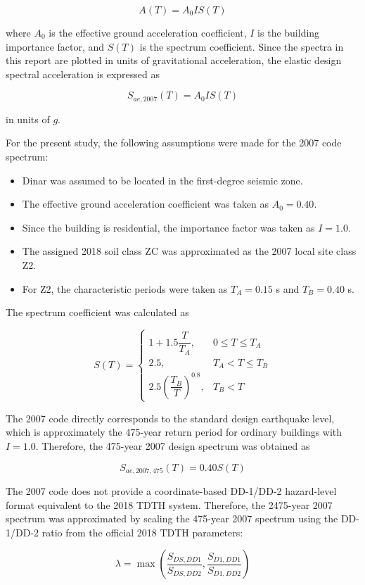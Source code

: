 ﻿\documentclass[12pt]{article}
\begin{document}
\[
    A(T) = A_0 I S(T)
\]

where $A_0$ is the effective ground acceleration coefficient, $I$ is the building importance factor, and $S(T)$ is the spectrum coefficient. Since the spectra in this report are plotted in units of gravitational acceleration, the elastic design spectral acceleration is expressed as

\[
    S_{ae,2007}(T) = A_0 I S(T)
\]

in units of $g$.

For the present study, the following assumptions were made for the 2007 code spectrum:

\begin{itemize}
    \item Dinar was assumed to be located in the first-degree seismic zone.
    \item The effective ground acceleration coefficient was taken as $A_0=0.40$.
    \item Since the building is residential, the importance factor was taken as $I=1.0$.
    \item The assigned 2018 soil class ZC was approximated as the 2007 local site class Z2.
    \item For Z2, the characteristic periods were taken as $T_A=0.15$ s and $T_B=0.40$ s.
\end{itemize}

The spectrum coefficient was calculated as

\[
S(T)=
\begin{cases}
1+1.5\dfrac{T}{T_A}, & 0 \leq T \leq T_A \\[0.35cm]
2.5, & T_A < T \leq T_B \\[0.35cm]
2.5\left(\dfrac{T_B}{T}\right)^{0.8}, & T_B < T
\end{cases}
\]

The 2007 code directly corresponds to the standard design earthquake level, which is approximately the 475-year return period for ordinary buildings with $I=1.0$. Therefore, the 475-year 2007 design spectrum was obtained as

\[
    S_{ae,2007,475}(T)=0.40S(T)
\]

The 2007 code does not provide a coordinate-based DD-1/DD-2 hazard-level format equivalent to the 2018 TDTH system. Therefore, the 2475-year 2007 spectrum was approximated by scaling the 475-year 2007 spectrum using the DD-1/DD-2 ratio from the official 2018 TDTH parameters:

\[
    \lambda =
    \max\left(
    \frac{S_{DS,DD1}}{S_{DS,DD2}},
    \frac{S_{D1,DD1}}{S_{D1,DD2}}
    \right)
\]
\end{document}
